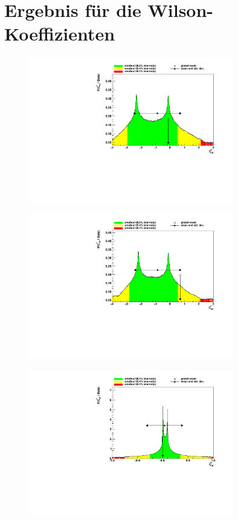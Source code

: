 \section{Ergebnis für die Wilson-Koeffizienten}

\begin{figure}
    \centering
    \includegraphics[width=0.8\textwidth]{Plots/result_CtG.pdf}
\end{figure}
\begin{figure}
    \centering
    \includegraphics[width=0.8\textwidth]{Plots/result_CtW.pdf}
\end{figure}
\begin{figure}
    \centering
    \includegraphics[width=0.8\textwidth]{Plots/result_CtB.pdf}
\end{figure}
